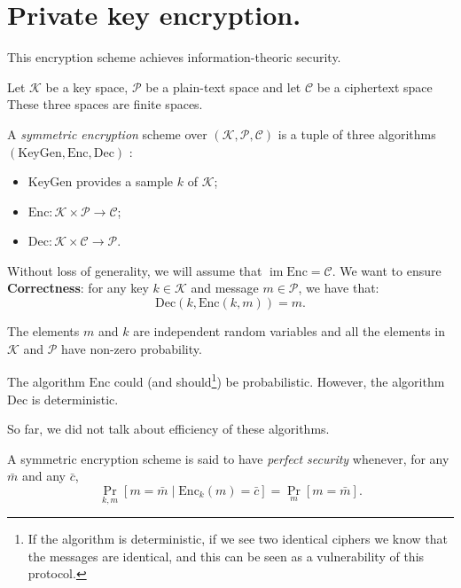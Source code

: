 \documentclass[./main]{subfiles}
\begin{document}
  \chapter{Private key encryption.}

  This encryption scheme achieves information-theoric security.

  \begin{defn}
    Let $\mathcal{K}$ be a key space, $\mathcal{P}$ be a plain-text space and let $\mathcal{C}$ be a ciphertext space
    These three spaces are finite spaces.

    A \textit{symmetric encryption} scheme over $(\mathcal{K}, \mathcal{P}, \mathcal{C})$ is a tuple of three algorithms $(\mathrm{KeyGen}, \mathrm{Enc}, \mathrm{Dec})$ :
    \begin{itemize}
      \item $\mathrm{KeyGen}$ provides a sample $k$ of $\mathcal{K}$;
      \item $\mathrm{Enc} : \mathcal{K} \times \mathcal{P} \to \mathcal{C}$;
      \item $\mathrm{Dec} : \mathcal{K} \times \mathcal{C} \to \mathcal{P}$.
    \end{itemize}
    Without loss of generality, we will assume that $\operatorname{im} \mathrm{Enc} = \mathcal{C}$.
    We want to ensure \textbf{Correctness}: for any key $k \in \mathcal{K}$ and message $m \in \mathcal{P}$, we have that:
  \[
    \mathrm{Dec}(k, \mathrm{Enc}(k, m)) = m
    .\]

    The elements $m$ and $k$ are independent random variables and all the elements in $\mathcal{K}$ and $\mathcal{P}$ have non-zero probability.
  \end{defn}

  \begin{rmk}
    The algorithm $\mathrm{Enc}$ could (and should\footnote{If the algorithm is deterministic, if we see two identical ciphers we know that the messages are identical, and this can be seen as a vulnerability of this protocol.}) be probabilistic.
    However, the algorithm $\mathrm{Dec}$ is deterministic.
    
    So far, we did not talk about efficiency of these algorithms.
  \end{rmk}

  \begin{defn}[Shannon, 1949]
    A symmetric encryption scheme is said to have \textit{perfect security} whenever, for any $\bar{m}$ and any $\bar{c}$, 
    \[
      \Pr_{k,m}[m = \bar{m}  \mid \mathrm{Enc}_k(m) = \bar{c}] = \Pr_{m}[m = \bar{m}]
    .\] 
  \end{defn}
\end{document}
